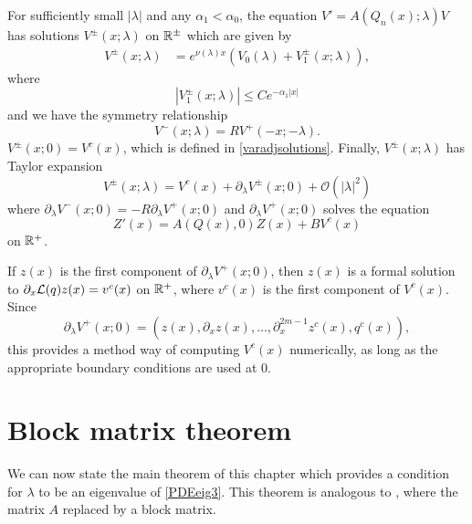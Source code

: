 \documentclass[thesis.tex]{subfiles}
\begin{document}
\begin{lemma}\label{lemma:Vpm}
For sufficiently small $|\lambda|$ and any $\alpha_1 < \alpha_0$, the equation $V' = A(Q_n(x); \lambda)V$ has solutions $V^\pm(x; \lambda)$ on $\mathbb{R}^\pm$ which are given by
\begin{align}\label{Vpmlambda}
V^\pm(x; \lambda) &= e^{\nu(\lambda)x}(V_0(\lambda) + V_1^\pm(x; \lambda)),
\end{align}
where
\begin{equation}\label{Vpmdecay}
|V_1^\pm(x; \lambda)| \leq C e^{-\alpha_1 |x|}
\end{equation}
and we have the symmetry relationship
\begin{equation}\label{Vpmsymmetry}
V^-(x; \lambda) = R V^+(-x; -\lambda).
\end{equation}
$V^\pm(x; 0) = V^c(x)$, which is defined in \cref{varadjsolutions}. Finally, $V^\pm(x; \lambda)$ has Taylor expansion
\begin{equation}
V^\pm(x; \lambda) = V^c(x) + \partial_\lambda V^\pm(x; 0) + \mathcal{O}(|\lambda|^2)
\end{equation}
where $\partial_\lambda V^-(x; 0) = -R \partial_\lambda V^+(x; 0)$ and $\partial_\lambda V^+(x; 0)$ solves the equation
\[
Z'(x) = A(Q(x),0) Z(x) + B V^c(x)
\]
on $\mathbb{R}^+$.
\end{lemma}

\begin{remark}\label{remark:computeVc}
If $z(x)$ is the first component of $\partial_\lambda V^+(x; 0)$, then $z(x)$ is a formal solution to $\partial_x \mathcal{L}(q) z(x) = v^c(x)$ on $\mathbb{R}^+$, where $v^c(x)$ is the first component of $V^c(x)$. Since
\[
\partial_\lambda V^+(x; 0) = (z(x), \partial_x z(x), \dots, \partial_x^{2m-1}z^c(x), q^c(x) ),
\]
this provides a method way of computing $V^c(x)$ numerically, as long as the appropriate boundary conditions are used at 0.
\end{remark}

\section{Block matrix theorem}

We can now state the main theorem of this chapter which provides a condition for $\lambda$ to be an eigenvalue of \eqref{PDEeig3}. This theorem is analogous to \cite[Theorem 2]{Sandstede1998}, where the matrix $A$ replaced by a block matrix.
\end{document}
